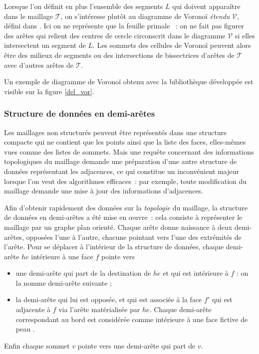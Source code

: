 \documentclass[12pt,a4paper]{report}
\begin{document}
Lorsque l'on définit en plus l'ensemble des segments $L$ qui doivent apparaître dans le maillage $\mathcal{T}$, on s'intéresse plutôt au diagramme de Voronoï \emph{étendu} $\mathcal{V}$, défini dans \cite[pages 30-31]{Edelsbrunner}. Ici on ne représente que la \og feuille primale \fg{}~: on ne fait pas figurer des arêtes qui relient des centres de cercle circonscrit dans le diagramme $\mathcal{V}$ si elles intersectent un segment de $L$. Les sommets des cellules de Voronoï peuvent alors être des milieux de segments ou des intersections de bissectrices d'arêtes de $\mathcal{T}$ avec d'autres arêtes de $\mathcal{T}$.

Un exemple de diagramme de Voronoï obtenu avec la bibliothèque développée est visible sur la figure \ref{del_vor}.


\subsubsection{Structure de données en demi-arêtes}

Les maillages non structurés peuvent être représentés dans une structure compacte qui ne contient que les points ainsi que la liste des faces, elles-mêmes vues comme des listes de sommets. Mais une requête concernant des informations topologiques du maillage demande une préparation d'une autre structure de données représentant les adjacences, ce qui constitue un inconvénient majeur lorsque l'on veut des algorithmes efficaces~: par exemple, toute modification du maillage demande une mise à jour des informations d'adjacences.

Afin d'obtenir rapidement des données sur la \emph{topologie} du maillage, la structure de données en demi-arêtes a été mise en \oe{}uvre~: cela consiste à représenter le maillage par un graphe plan orienté. Chaque arête donne naissance à deux demi-arêtes, opposées l'une à l'autre, chacune pointant vers l'une des extrémités de l'arête. Pour se déplacer à l'intérieur de la structure de données, chaque demi-arête $he$ intérieure à une face $f$ pointe vers 
\begin{itemize}
\item une demi-arête qui part de la destination de $he$ et qui est intérieure à $f$ : on la nomme demi-arête suivante ;
\item la demi-arête qui lui est opposée, et qui est associée à la face $f'$ qui est adjacente à $f$ via l'arête matérialisée par $he$. Chaque demi-arête correspondant au bord est considérée comme intérieure à une face fictive de \og peau \fg{}.
\end{itemize}
Enfin chaque sommet $v$ pointe vers une demi-arête qui part de $v$.
\end{document}
